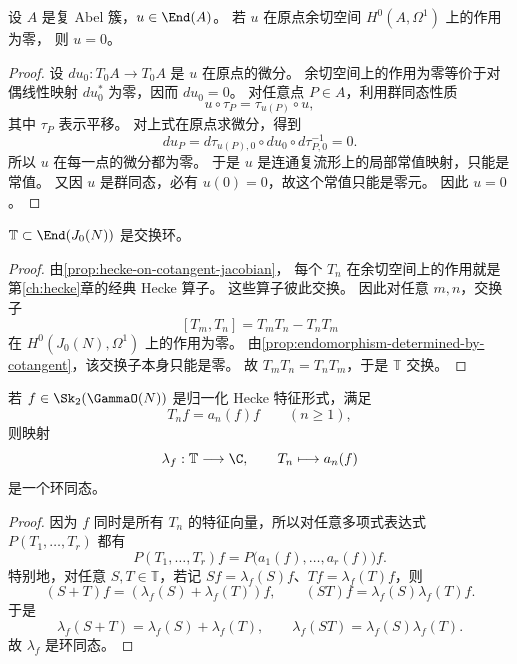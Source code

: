 \begin{proposition}
\label{prop:endomorphism-determined-by-cotangent}
设 $A$ 是复 Abel 簇，$u\in\End(A)$。
若 $u$ 在原点余切空间 $H^0(A,\Omega^1)$ 上的作用为零，
则 $u=0$。
\end{proposition}

\begin{proof}
设 $du_0:T_0A\to T_0A$ 是 $u$ 在原点的微分。
余切空间上的作用为零等价于对偶线性映射 $du_0^*$ 为零，因而 $du_0=0$。
对任意点 $P\in A$，利用群同态性质
\[
  u\circ \tau_P=\tau_{u(P)}\circ u,
\]
其中 $\tau_P$ 表示平移。
对上式在原点求微分，得到
\[
  du_P=d\tau_{u(P),0}\circ du_0\circ d\tau_{P,0}^{-1}=0.
\]
所以 $u$ 在每一点的微分都为零。
于是 $u$ 是连通复流形上的局部常值映射，只能是常值。
又因 $u$ 是群同态，必有 $u(0)=0$，故这个常值只能是零元。
因此 $u=0$。
\end{proof}

\begin{corollary}
\label{cor:hecke-algebra-commutative-jacobian}
$\mathbb T\subset \End(J_0(N))$ 是交换环。
\end{corollary}

\begin{proof}
由\cref{prop:hecke-on-cotangent-jacobian}，
每个 $T_n$ 在余切空间上的作用就是第\ref{ch:hecke}章的经典 Hecke 算子。
这些算子彼此交换。
因此对任意 $m,n$，交换子
\[
  [T_m,T_n]=T_mT_n-T_nT_m
\]
在 $H^0(J_0(N),\Omega^1)$ 上的作用为零。
由\cref{prop:endomorphism-determined-by-cotangent}，该交换子本身只能是零。
故 $T_mT_n=T_nT_m$，于是 $\mathbb T$ 交换。
\end{proof}

\begin{proposition}
\label{prop:eigenform-gives-character}
若 $f\in \Sk_2(\GammaO(N))$ 是归一化 Hecke 特征形式，满足
\[
  T_nf=a_n(f)f \qquad (n\ge 1),
\]
则映射
\[
  \lambda_f:\mathbb T\longrightarrow \C,
  \qquad
  T_n\longmapsto a_n(f)
\]
是一个环同态。
\end{proposition}

\begin{proof}
因为 $f$ 同时是所有 $T_n$ 的特征向量，所以对任意多项式表达式 $P(T_1,\dots,T_r)$ 都有
\[
  P(T_1,\dots,T_r)f=P\bigl(a_1(f),\dots,a_r(f)\bigr)f.
\]
特别地，对任意 $S,T\in\mathbb T$，若记 $Sf=\lambda_f(S)f$、$Tf=\lambda_f(T)f$，则
\[
  (S+T)f=(\lambda_f(S)+\lambda_f(T))f,
  \qquad
  (ST)f=\lambda_f(S)\lambda_f(T)f.
\]
于是
\[
  \lambda_f(S+T)=\lambda_f(S)+\lambda_f(T),
  \qquad
  \lambda_f(ST)=\lambda_f(S)\lambda_f(T).
\]
故 $\lambda_f$ 是环同态。
\end{proof}


